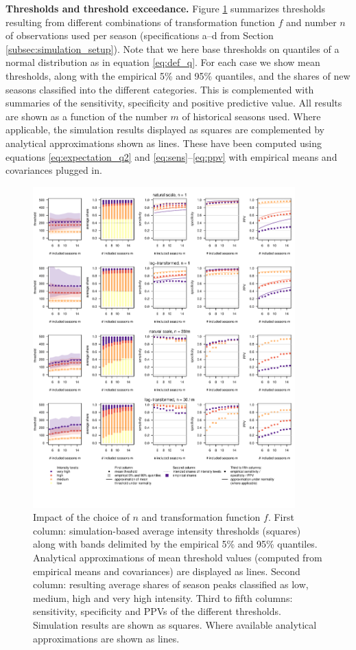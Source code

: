 \documentclass[12pt]{article}
\begin{document}
\textbf{Thresholds and threshold exceedance.} Figure \ref{fig:results1} summarizes thresholds resulting from different combinations of transformation function $f$ and number $n$ of observations used per season (specifications a--d from Section \ref{subsec:simulation_setup}). Note that we here base thresholds on quantiles of a normal distribution as in equation \eqref{eq:def_q}. For each case we show mean thresholds, along with the empirical 5\% and 95\% quantiles, and the shares of new seasons classified into the different categories. This is complemented with summaries of the sensitivity, specificity and positive predictive value. All results are shown as a function of the number $m$ of historical seasons used. Where applicable, the simulation results displayed as squares are complemented by analytical approximations shown as lines. These have been computed using equations \eqref{eq:expectation_q2} and \eqref{eq:sens}--\eqref{eq:ppv} with empirical means and covariances plugged in.

\begin{figure}[h!]
\centering
\includegraphics[width=0.9\textwidth]{figure/plot_fr.pdf}

\vspace{-1.5cm}

\caption{Impact of the choice of $n$ and transformation function $f$. First column: simulation-based average intensity thresholds (squares) along with bands delimited by the empirical 5\% and 95\% quantiles. Analytical approximations of mean threshold values (computed from empirical means and covariances) are displayed as lines. Second column: resulting average shares of season peaks classified as low, medium, high and very high intensity. Third to fifth columns: sensitivity, specificity and PPVs of the different thresholds. Simulation results are shown as squares. Where available analytical approximations are shown as lines.}
\label{fig:results1}
\end{figure}
\end{document}
